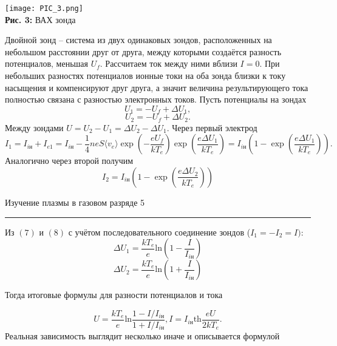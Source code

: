\documentclass[12pt,a4paper]{scrartcl}
\begin{document}
\begin{center}
\texttt{[image: PIC\_3.png]}
\\\textbf{Рис. 3:} ВАХ зонда
\end{center} 
	
Двойной зонд -- система из двух одинаковых зондов, расположенных на небольшом расстоянии друг от друга, между которыми создаётся разность потенциалов, меньшая $U_f$. Рассчитаем ток между ними вблизи $I=0$. При небольших разностях потенциалов ионные токи на оба зонда близки к току насыщения и компенсируют друг друга, а значит величина результирующего тока полностью связана с разностью электронных токов. Пусть потенциалы на зондах
$$
U_1 = -U_f + \Delta U_1,
$$
$$
U_2 = -U_f + \Delta U_2.
$$
Между зондами $U = U_2 - U_1 = \Delta U_2 - \Delta U_1$.
Через первый электрод
\begin{equation}
I_1 = I_{i\text{н}} + I_{e1} = I_{i\text{н}} - \dfrac{1}{4}neS\langle v_e\rangle \exp\left(-\dfrac{eU_f}{kT_e}\right)\exp\left(\dfrac{e\Delta U_1}{kT_e}\right)=I_{i\text{н}}\left(1 - \exp\left( \dfrac{e\Delta U_1}{kT_e} \right)\right).
\end{equation}
Аналогично через второй получим
\begin{equation}
I_2 = I_{i\text{н}}\left(1 - \exp\left( \dfrac{e\Delta U_2}{kT_e} \right)\right)
\end{equation}
	
	\newpage
	

	\begin{flushleft}
		\footnotesize{Изучение плазмы в газовом разряде} \hspace{\fill} \footnotesize{5}
		\\[-0.3cm]\noindent\rule{\textwidth}{0.3pt}
	\end{flushleft}	
	
Из $(7)$ и $(8)$ с учётом последовательного соединение зондов ($I_1 = -I_2 = I)$:
$$
\Delta U_1= \dfrac{kT_e}{e}\text{ln}\left(1 - \dfrac{I}{I_{i\text{н}}}\right)
$$
$$
\Delta U_2= \dfrac{kT_e}{e}\text{ln}\left(1 + \dfrac{I}{I_{i\text{н}}}\right)
$$

Тогда итоговые формулы для разности потенциалов и тока

\begin{equation}
U = \dfrac{kT_e}{e}\text{ln}\dfrac{1 - I/I_{i\text{н}}}{1 + I/I_{i\text{н}}}, 
I = I_{i\text{н}} \text{th}\dfrac{eU}{2kT_e}.
\end{equation}
Реальная зависимость выглядит несколько иначе и описывается формулой 
\end{document}
